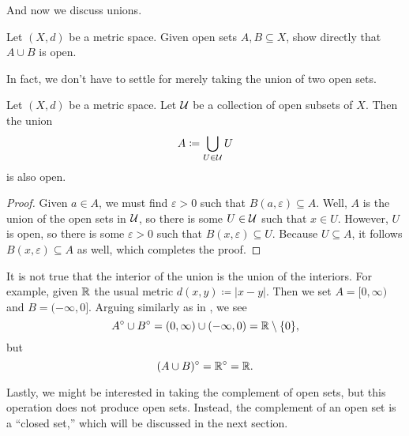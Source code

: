 \documentclass[../main.tex]{subfiles}
\begin{document}
And now we discuss unions.
\begin{exe}
    Let $(X,d)$ be a metric space. Given open sets $A,B\subseteq X$, show directly that $A\cup B$ is open.
\end{exe}
In fact, we don't have to settle for merely taking the union of two open sets.
\begin{proposition} \label{prop:union-open-sets}
    Let $(X,d)$ be a metric space. Let $\mathcal{U}$ be a collection of open subsets of $X$. Then the union
    \[A\coloneqq\bigcup_{U\in\mathcal{U}}U\]
    is also open.
\end{proposition}
\begin{proof}
    Given $a\in A$, we must find $\varepsilon>0$ such that $B(a,\varepsilon)\subseteq A$. Well, $A$ is the union of the open sets in $\mathcal{U}$, so there is some $U\in\mathcal{U}$ such that $x\in U$. However, $U$ is open, so there is some $\varepsilon>0$ such that $B(x,\varepsilon)\subseteq U$. Because $U\subseteq A$, it follows $B(x,\varepsilon)\subseteq A$ as well, which completes the proof.
\end{proof}
\begin{exe} \label{ex:int-union}
    It is not true that the interior of the union is the union of the interiors. For example, given $\mathbb R$ the usual metric $d(x,y)\coloneqq|x-y|$. Then we set $A=[0,\infty)$ and $B=(-\infty,0]$. Arguing similarly as in , we see
    \[A^\circ\cup B^\circ=(0,\infty)\cup(-\infty,0)=\mathbb R\setminus\{0\},\]
    but
    \[(A\cup B)^\circ=\mathbb R^\circ=\mathbb R.\]
\end{exe}
Lastly, we might be interested in taking the complement of open sets, but this operation does not produce open sets. Instead, the complement of an open set is a ``closed set,'' which will be discussed in the next section.
\end{document}

